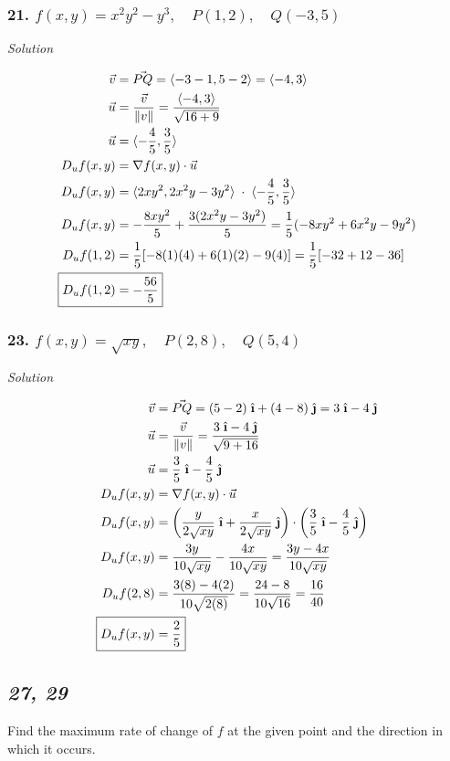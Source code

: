 \documentclass{article}
\newcommand{\ihat}{\;\hat{\textbf{\i}}}
\newcommand{\jhat}{\;\hat{\textbf{\j}}}
\newcommand\vv[1]{\langle #1 \rangle}
\newcommand\mgv[1]{\|#1\|}
\newcommand{\solution}{\centerline{\textit{Solution}}}
\newcommand{\bp}[1]{\left(#1\right)}
\begin{document}
\subsubsection*{21. $f(x,y) = x^2y^2-y^3,\quad P(1,2), \quad Q(-3,5)$}
\solution
\begin{align*}
    \vec v &= \vec {PQ} = \vv{-3-1, 5-2} = \vv{-4, 3} \\
    \vec u &= \frac {\vec v}{\mgv{v}} = \displaystyle\frac{\vv{-4,
    3}}{\sqrt{16+9}} \\
    \vec u &= \vv{-\frac 4 5, \frac 3 5} \\
    D_u f(x,y) &= \nabla f(x,y) \cdot \vec u \\
    D_u f(x,y) &= \vv{2xy^2, 2x^2y-3y^2}\;\cdot\;\vv{-\frac 4 5, \frac 3 5} \\
    D_u f(x,y) &= -\displaystyle\frac{8xy^2}{5} +
    \displaystyle\frac{3(2x^2y-3y^2)}{5} = \frac 1 5(-8xy^2+6x^2y-9y^2) \\
    D_u f(1,2) &= \frac 1 5[-8(1)(4) + 6(1)(2)-9(4)] = \frac 1 5[-32 + 12 - 36] \\
    \Aboxed{D_u f(1,2) &= -\frac{56}{5}}
\end{align*}
\subsubsection*{23. $f(x,y) = \sqrt{xy},\quad P(2,8),\quad Q(5,4)$}
\solution
\begin{align*}
    \vec v &= \vec {PQ} = (5-2)\ihat + (4-8)\jhat = 3\ihat - 4\jhat \\
    \vec u &= \frac {\vec v}{\mgv{v}} = \displaystyle\frac{3\ihat -
    4\jhat}{\sqrt{9 + 16}} \\
    \vec u &= \frac 3 5\ihat - \frac 4 5\jhat \\
    D_u f(x,y) &= \nabla f(x,y) \cdot \vec u \\
    D_u f(x,y) &= 
    \bp{\displaystyle\frac{y}{2\sqrt{xy}}\ihat+\displaystyle\frac{x}{2\sqrt{xy}}\jhat}
    \cdot \bp{\frac 3 5\ihat - \frac 4 5\jhat} \\
    D_u f(x,y) &= \displaystyle\frac{3y}{10\sqrt{xy}} -
    \displaystyle\frac{4x}{10\sqrt{xy}} = \displaystyle\frac{3y-4x}{10\sqrt{xy}}
    \\
    D_u f(2,8) &= \frac{3(8)-4(2)}{10\sqrt{2(8)}} = \frac{24-8}{10\sqrt{16}} =
    \frac {16}{40} \\
    \Aboxed{D_u f(x,y) &= \frac 2 5}
\end{align*}
\newpage 
\begin{center}
    \subsection*{\textit{27, 29}} 
    Find the maximum rate of change of $f$ at the given point and the direction
    in which it occurs.
\end{center}
\end{document}
